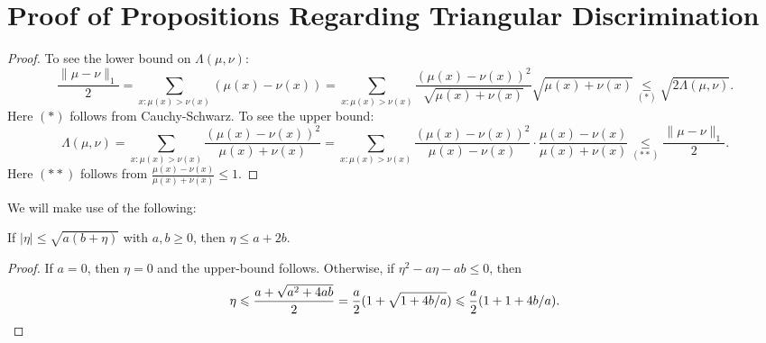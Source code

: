 \documentclass[11pt,letterpaper]{article}
\renewcommand{\geq}{\geqslant}
\renewcommand{\leq}{\leqslant}
\renewcommand{\le}{\leq}
\theoremstyle{definition}
\begin{document}
\section{Proof of Propositions Regarding Triangular Discrimination} \label{sec:td-props}

\lambdatvd*

\begin{proof}
To see the lower bound on $\Lambda(\mu, \nu)$:
\[
\frac{\|\mu - \nu\|_1} 2 = \sum_{x: \mu(x) > \nu(x)} (\mu(x) - \nu(x)) =  \sum_{x: \mu(x) > \nu(x)} \frac{(\mu(x) - \nu(x))^2}{\sqrt{\mu(x) + \nu(x)}} \sqrt{\mu(x) + \nu(x)} \underset{(*)}{\leq} \sqrt{2\Lambda(\mu, \nu)}.
\]
Here $(*)$ follows from Cauchy-Schwarz. To see the upper bound:
\[
\Lambda(\mu, \nu) = \sum_{x: \mu(x) > \nu(x)}\frac{(\mu(x) - \nu(x))^2}{\mu(x) + \nu(x)} = \sum_{x: \mu(x) > \nu(x)}\frac{(\mu(x) - \nu(x))^2}{\mu(x) - \nu(x)} \cdot \frac{\mu(x) - \nu(x)}{\mu(x) + \nu(x)} \underset{(**)}{\leq} \frac{\|\mu - \nu\|_1} 2.
\]
Here $(**)$ follows from $\frac{\mu(x) - \nu(x)}{\mu(x) + \nu(x)}\leq 1$.

\end{proof}

We will make use of the following:

\begin{proposition}
\label{fact:trick1}
If $|\eta| \leq \sqrt{a(b+ \eta)}$ with $a,b\geq 0$, then $\eta \leq a + 2b$.
\end{proposition}

\begin{proof}
    If $a = 0$, then $\eta = 0$ and the upper-bound follows. Otherwise, if $\eta^2 - a \eta - a b \le 0$, then
    \[
    \eta \le \frac{a + \sqrt{a^2 + 4 a b}}{2} = \frac{a}{2} (1 + \sqrt{1 + 4 b/a}) \le \frac{a}{2}(1 + 1 + 4 b/a). \qedhere
    \]
\end{proof}

\lambdaloss*
\end{document}
